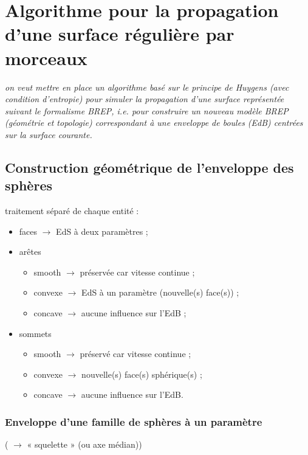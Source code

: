 \chapter{Algorithme pour la propagation d'une surface régulière par morceaux}

\textit{on veut mettre en place un algorithme basé sur le principe de Huygens (avec condition d'entropie) pour simuler la propagation d'une surface représentée suivant le formalisme BREP, i.e. pour construire un nouveau modèle BREP (géométrie et topologie) correspondant à une enveloppe de boules (EdB) centrées sur la surface courante. }

\section{Construction géométrique de l'enveloppe des sphères}
traitement séparé de chaque entité \brep  :
\begin{itemize}
	\item faces $\to$ EdS à deux paramètres ;
	\item arêtes
	\begin{itemize}
		\item smooth $\to$ préservée car vitesse continue ;
		\item convexe $\to$ EdS à un paramètre (nouvelle(s) face(s)) ;
		\item concave $\to$ aucune influence sur l'EdB ;
	\end{itemize}
	\item sommets
	\begin{itemize}
		\item smooth $\to$ préservé car vitesse continue ;
		\item convexe $\to$ nouvelle(s) face(s) sphérique(s) ;
		\item concave $\to$ aucune influence sur l'EdB.
	\end{itemize}
\end{itemize}


\subsection{Enveloppe d'une famille de sphères à un paramètre}
 \cite{peternell1997} ( $\to$ « squelette » (ou axe médian))

